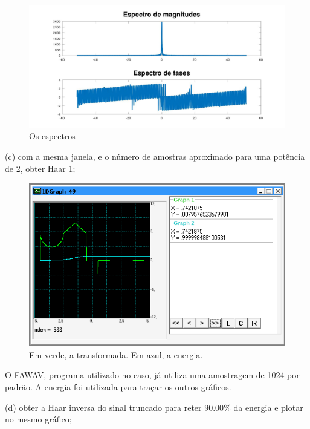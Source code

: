 \documentclass[10pt]{article}
\begin{document}
\begin{figure}[h]
    \includegraphics[scale=0.3]{plot2b.jpg}
    \centering
    \caption{Os espectros}
\end{figure}

(c) com a mesma janela, e o número de amostras aproximado para uma potência de 2, obter Haar 1;

\begin{figure}[h]
    \includegraphics[scale=0.4]{plot2c.png}
    \centering
    \caption{Em verde, a transformada. Em azul, a energia.}
\end{figure}
O FAWAV, programa utilizado no caso, já utiliza uma amostragem de 1024 por padrão. A energia foi utilizada para traçar os outros gráficos.

(d) obter a Haar inversa do sinal truncado para reter $90.00\%$ da energia e plotar no mesmo gráfico;
\end{document}
